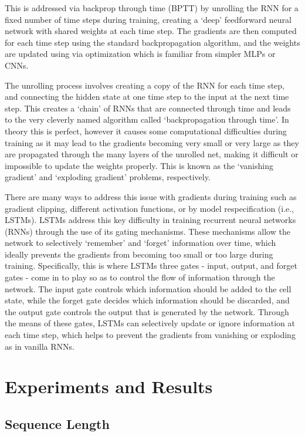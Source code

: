 \documentclass[12pt, twoside]{report}
\begin{document}
This is addressed via backprop through time (BPTT) by unrolling the RNN for a fixed number of time steps during training, 
creating a `deep' feedforward neural network with shared weights at each time step.
The gradients are then computed for each time step using the standard backpropagation algorithm, 
and the weights are updated using via optimization which is familiar from simpler MLPs or CNNs.

The unrolling process involves creating a copy of the RNN for each time step, and connecting the hidden state at 
one time step to the input at the next time step.
This creates a `chain' of RNNs that are connected through time and leads to the very cleverly named algorithm 
called `backpropagation through time'.
In theory this is perfect, however it causes some computational difficulties during training as it may lead to
the gradients becoming very small or very large as they are propagated through the many layers of the unrolled net,
making it difficult or impossible to update the weights properly.
This is known as the `vanishing gradient' and `exploding gradient' problems, respectively.

There are many ways to address this issue with gradients during training such as gradient clipping, different
activation functions, or by model respecification (i.e., LSTMs).
LSTMs address this key difficulty in training recurrent neural networks (RNNs) through the use of its gating mechanisms.
These mechanisms allow the network to selectively `remember' and `forget' information over time, 
which ideally prevents the gradients from becoming too small or too large during training.
Specifically, this is where LSTMs three gates - input, output, and forget gates - come in to play so as to 
control the flow of information through the network.
The input gate controls which information should be added to the cell state, while the forget gate decides 
which information should be discarded, and the output gate controls the output that is generated by the network.
Through the means of these gates, LSTMs can selectively update or ignore information at each time step,
which helps to prevent the gradients from vanishing or exploding as in vanilla RNNs.

\chapter{Experiments and Results}

\section{Sequence Length}
\end{document}
